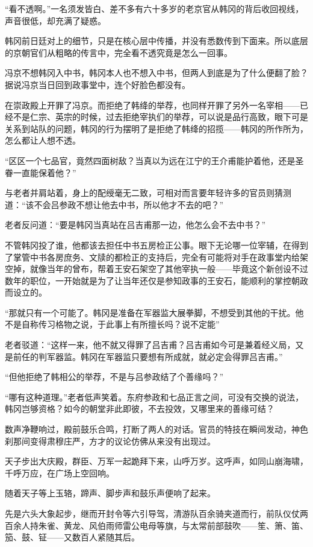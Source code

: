 “看不透啊。”一名须发皆白、差不多有六十多岁的老京官从韩冈的背后收回视线，声音很低，却充满了疑惑。

韩冈前日廷对上的细节，只是在核心层中传播，并没有悉数传到下面来。所以底层的京朝官们从粗略的传言中，完全看不透究竟是怎么一回事。

冯京不想韩冈入中书，韩冈本人也不想入中书，但两人到底是为了什么便翻了脸？据说冯京当日回到政事堂中，连个好脸色都没有。

在崇政殿上开罪了冯京。而拒绝了韩绛的举荐，也同样开罪了另外一名宰相——已经不是仁宗、英宗的时候，过去拒绝宰执们的举荐，可以说是品行高致，眼下可是关系到站队的问题，韩冈的行为摆明了是拒绝了韩绛的招揽——韩冈的所作所为，怎么都让人想不透。

“区区一个七品官，竟然四面树敌？当真以为远在江宁的王介甫能护着他，还是圣眷一直能保着他？”

与老者并肩站着，身上的配绶毫无二致，可相对而言要年轻许多的官员则猜测道：“该不会吕参政不想让他去中书，所以他才不去的吧？”

老者反问道：“要是韩冈当真站在吕吉甫那一边，他怎么会不去中书？”

不管韩冈投了谁，他都该去担任中书五房检正公事。眼下无论哪一位宰辅，在得到了掌管中书各房庶务、文牍的都检正的支持后，完全有可能将对手在政事堂内给架空掉，就像当年的曾布，帮着王安石架空了其他宰执一般——毕竟这个新创设不过数年的职位，一开始就是为了让当年还仅是参知政事的王安石，能顺利的掌控朝政而设立的。

“那就只有一个可能了。韩冈是准备在军器监大展拳脚，不想受到其他的干扰。他不是自称传习格物之说，于此事上有所擅长吗？说不定能”

老者驳道：“这样一来，他不就又得罪了吕吉甫？吕吉甫如今可是兼着经义局，又是前任的判军器监。韩冈在军器监只要想有所成就，就必定会得罪吕吉甫。”

“但他拒绝了韩相公的举荐，不是与吕参政结了个善缘吗？”

“哪有这种道理。”老者低声笑着。东府参政和七品正言之间，可没有交换的说法，韩冈岂够资格？如今的朝堂非此即彼，不去投效，又哪里来的善缘可结？

数声净鞭响过，殿前鼓乐合鸣，打断了两人的对话。官员的特技在瞬间发动，神色刹那间变得肃穆庄严，方才的议论仿佛从来没有出现过。

天子步出大庆殿，群臣、万军一起跪拜下来，山呼万岁。这呼声，如同山崩海啸，千呼万应，在广场上空回响。

随着天子等上玉辂，蹄声、脚步声和鼓乐声便响了起来。

先是六头大象起步，继而开封令等六引导驾，清游队百余骑夹道而行，前队仪仗两百余人持朱雀、黄龙、风伯雨师雷公电母等旗，与太常前部鼓吹——笙、箫、笛、笳、鼓、钲——又数百人紧随其后。


